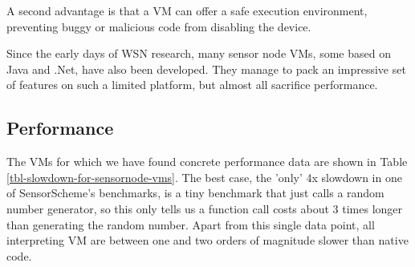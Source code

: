A second advantage is that a VM can offer a safe execution environment, preventing buggy or malicious code from disabling the device.


Since the early days of WSN research, many sensor node VMs, some based on Java and .Net, have also been developed. They manage to pack an impressive set of features on such a limited platform, but almost all sacrifice performance.

\subsection{Performance}
\label{sec-introduction-performance}
The VMs for which we have found concrete performance data are shown in Table \ref{tbl-slowdown-for-sensornode-vms}. The best case, the 'only' 4x slowdown in one of SensorScheme's benchmarks, is a tiny benchmark that just calls a random number generator, so this only tells us a function call costs about 3 times longer than generating the random number. Apart from this single data point, all interpreting VM are between one and two orders of magnitude slower than native code.

